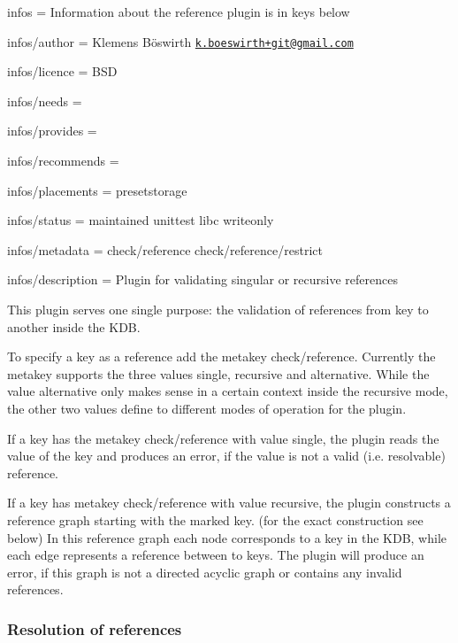 
\begin{DoxyItemize}
\item infos = Information about the reference plugin is in keys below
\item infos/author = Klemens Böswirth \href{mailto:k.boeswirth+git@gmail.com}{\tt k.\+boeswirth+git@gmail.\+com}
\item infos/licence = B\+SD
\item infos/needs =
\item infos/provides =
\item infos/recommends =
\item infos/placements = presetstorage
\item infos/status = maintained unittest libc writeonly
\item infos/metadata = check/reference check/reference/restrict
\item infos/description = Plugin for validating singular or recursive references
\end{DoxyItemize}

This plugin serves one single purpose\+: the validation of references from key to another inside the K\+DB.

To specify a key as a reference add the metakey {\ttfamily check/reference}. Currently the metakey supports the three values {\ttfamily single}, {\ttfamily recursive} and {\ttfamily alternative}. While the value {\ttfamily alternative} only makes sense in a certain context inside the {\ttfamily recursive} mode, the other two values define to different modes of operation for the plugin.

If a key has the metakey {\ttfamily check/reference} with value {\ttfamily single}, the plugin reads the value of the key and produces an error, if the value is not a valid (i.\+e. resolvable) reference.

If a key has metakey {\ttfamily check/reference} with value {\ttfamily recursive}, the plugin constructs a reference graph starting with the marked key. (for the exact construction see below) In this reference graph each node corresponds to a key in the K\+DB, while each edge represents a reference between to keys. The plugin will produce an error, if this graph is not a directed acyclic graph or contains any invalid references.

\subsubsection*{Resolution of references}

